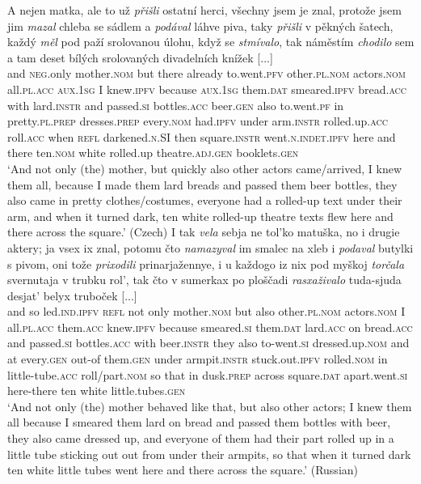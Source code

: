 \documentclass[output=paper,colorlinks,citecolor=brown]{langscibook}
\begin{document}
\ea\label{ex:sext}
\ea	\label{ex:sextcz}
\gll A nejen matka, ale to už \textit{přišli} ostatní herci, všechny jsem je znal, protože jsem jim \textit{mazal} chleba se sádlem a \textit{podával} láhve piva, taky \textit{přišli} v pěkných šatech, každý \textit{měl} pod paží srolovanou \'{u}lohu, když se \textit{stmívalo}, tak náměstím \textit{chodilo} sem a tam deset bílých srolovaných divadelních knížek [...]\\
	and \textsc{neg}.only mother.\textsc{nom} but there already to.went.\textsc{pfv} other.\textsc{pl.nom} actors.\textsc{nom} all.\textsc{pl.acc} \textsc{aux.1sg} I knew.\textsc{ipfv} because \textsc{aux.1sg} them.\textsc{dat} smeared.\textsc{ipfv} bread.\textsc{acc} with lard.\textsc{instr} and passed.\textsc{si} bottles.\textsc{acc} beer.\textsc{gen} also to.went.\textsc{pf} in pretty.\textsc{pl.prep} dresses.\textsc{prep} every.\textsc{nom} had.\textsc{ipfv} under arm.\textsc{instr} rolled.up.\textsc{acc} roll.\textsc{acc} when \textsc{refl} darkened.\textsc{n.SI} then square.\textsc{instr} went.\textsc{n.indet.ipfv} here and there ten.\textsc{nom} white rolled.up theatre.\textsc{adj.gen} booklets.\textsc{gen}\\
\glt 	`And not only (the) mother, but quickly also other actors came/arrived, I knew them all, because I made them lard breads and passed them beer bottles, they also came in pretty clothes/costumes, everyone had a rolled-up text under their arm, and when it turned dark, ten white rolled-up theatre texts flew here and there across the square.' \hfill (Czech) %
\ex
\gll I tak \textit{vela} sebja ne tol'ko matuška, no i drugie aktery; ja vsex ix znal, {potomu čto} \textit{namazyval} im smalec na xleb i \textit{podaval} butylki s pivom, oni tože \textit{prixodili} prinarjažennye, i u každogo iz nix pod myškoj \textit{torčala} svernutaja v trubku rol', tak čto v sumerkax po ploščadi \textit{rasxaživalo} tuda-sjuda desjat' belyx truboček [...]\\
and so led.\textsc{ind.ipfv} \textsc{refl} not only mother.\textsc{nom} but also other.\textsc{pl.nom} actors.\textsc{nom} I all.\textsc{pl.acc} them.\textsc{acc} knew.\textsc{ipfv} because smeared.\textsc{si} them.\textsc{dat} lard.\textsc{acc} on bread.\textsc{acc} and passed.\textsc{si} bottles.\textsc{acc} with beer.\textsc{instr} they also to-went.\textsc{si} dressed.up.\textsc{nom} and at every.\textsc{gen} out-of them.\textsc{gen} under armpit.\textsc{instr} stuck.out.\textsc{ipfv} rolled.\textsc{nom} in little-tube.\textsc{acc} roll/part.\textsc{nom} so that in dusk.\textsc{prep} across square.\textsc{dat} apart.went.\textsc{si} here-there ten white little.tubes.\textsc{gen} \\
\glt `And not only (the) mother behaved like that, but also other actors; I knew them all because I smeared them lard on bread and passed them bottles with beer, they also came dressed up, and everyone of them had their part rolled up in a little tube sticking out out from under their armpits, so that when it turned dark ten white little tubes went here and there across the square.' \hfill (Russian)
\z
\z
\end{document}
